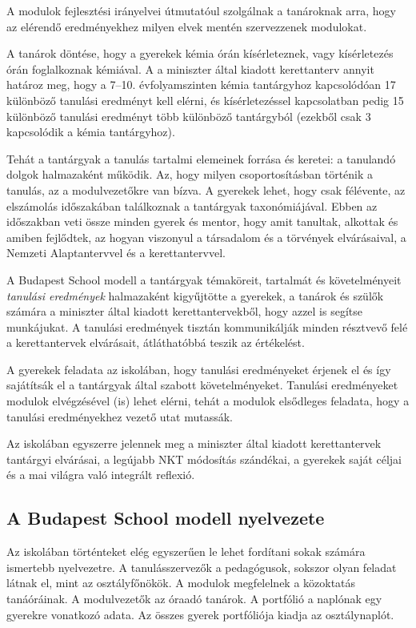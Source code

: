 A modulok fejlesztési irányelvei útmutatóul szolgálnak a tanároknak arra, hogy az elérendő eredményekhez milyen elvek mentén szervezzenek modulokat.

A tanárok döntése, hogy a gyerekek kémia órán kísérleteznek, vagy kísérletezés órán foglalkoznak kémiával. A a miniszter által kiadott kerettanterv annyit határoz meg, hogy  a 7--10. évfolyamszinten kémia tantárgyhoz kapcsolódóan 17 különböző tanulási eredményt kell elérni, és kísérletezéssel kapcsolatban pedig 15 különböző tanulási eredményt több különböző tantárgyból (ezekből csak 3 kapcsolódik a kémia tantárgyhoz).

Tehát a tantárgyak a tanulás tartalmi elemeinek forrása és keretei: a tanulandó dolgok halmazaként működik. Az, hogy milyen csoportosításban történik a tanulás, az a modulvezetőkre van bízva. A gyerekek lehet, hogy csak félévente, az elszámolás időszakában találkoznak a tantárgyak taxonómiájával. Ebben az időszakban veti össze minden gyerek és mentor, hogy amit tanultak, alkottak és amiben fejlődtek, az hogyan viszonyul a társadalom és a törvények elvárásaival, a Nemzeti Alaptantervvel és a kerettantervvel.

A Budapest School modell a tantárgyak témaköreit, tartalmát és követelményeit \emph{tanulási eredmények} halmazaként kigyűjtötte a gyerekek, a tanárok és szülők számára a miniszter által kiadott kerettantervekből, hogy azzel is segítse munkájukat. A tanulási eredmények tisztán kommunikálják minden résztvevő felé a kerettantervek elvárásait, átláthatóbbá teszik az értékelést. 

A gyerekek feladata az iskolában, hogy tanulási eredményeket érjenek el és így sajátítsák el a tantárgyak által szabott követelményeket. Tanulási eredményeket modulok elvégzésével (is) lehet elérni, tehát a modulok elsődleges feladata, hogy a tanulási eredményekhez vezető utat mutassák.

Az iskolában egyszerre jelennek meg a miniszter által kiadott kerettantervek tantárgyi elvárásai, a legújabb NKT módosítás szándékai, a gyerekek saját céljai és a mai világra való integrált reflexió. 

\subsection{A Budapest School modell nyelvezete}
Az iskolában történteket elég egyszerűen le lehet fordítani sokak számára ismertebb nyelvezetre. A tanulásszervezők a pedagógusok, sokszor olyan feladat látnak el, mint az osztályfőnökök. A modulok megfelelnek a közoktatás tanáóráinak. A modulvezetők az óraadó tanárok. A portfólió a naplónak egy gyerekre vonatkozó adata. Az összes gyerek portfóliója kiadja az osztálynaplót. 